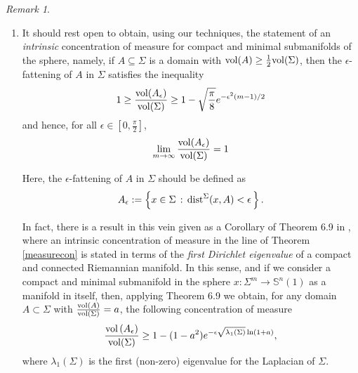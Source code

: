 \documentclass{amsart}
\theoremstyle{definition}
\theoremstyle{remark}
\newtheorem{remark}[theorem]{Remark}
\newcommand{\ese}{\mathbb{S}}
\begin{document}
\begin{remark}
\begin{enumerate}
\item  It should rest open to obtain, using our techniques, the statement of an {\em intrinsic} concentration of measure for compact and minimal submanifolds of the sphere, namely, if $A \subseteq \Sigma$ is a domain with ${\rm vol}(A) \geq \frac{1}{2} {\rm vol}(\Sigma)$, then the $\epsilon$-fattening of $A$ in $\Sigma$ satisfies the inequality
\begin{equation*}
1 \geq \frac{{\rm vol}(A_\epsilon)}{{\rm vol}(\Sigma)}\geq 1-\sqrt{\frac{\pi}{8}}e^{-\epsilon^2(m-1)/2}
\end{equation*}
\noindent and hence, for all $\epsilon \in [0,\frac{\pi}{2}]$, 
\begin{equation*}
\lim_{m\to \infty} \frac{{\rm vol}(A_\epsilon)}{{\rm vol}(\Sigma)}= 1
\end{equation*}
 

Here, the $\epsilon$-fattening of $A$ in $\Sigma$ should be defined as
$$A_\epsilon:=\left\{x\in \Sigma\, :\, {\rm dist}^{\Sigma}(x,A)<\epsilon\, \right\}.
$$

In fact, there is a result in this vein given as a Corollary of Theorem 6.9 in \cite{MS}, where an intrinsic concentration of measure in the line of Theorem \ref{measurecon} is stated in terms of the {\em first Dirichlet eigenvalue} of a compact and connected Riemannian manifold. In this sense, and if we consider a compact and minimal submanifold in the sphere $x:\Sigma^m \rightarrow \ese^n(1)$ as a manifold in itself, then, applying Theorem 6.9 we obtain, for any domain $A\subset \Sigma$ with $\frac{{\rm vol}(A)}{{\rm vol}( \Sigma)}=a$, the following concentration of measure
\begin{equation}\label{eq:Lambda}
   \frac{{\rm vol}\left(A_\epsilon\right)}{{\rm vol}( \Sigma)}\geq 1-(1-a^2)e^{-\epsilon\sqrt{\lambda_1(\Sigma)}\ln(1+a)}, 
\end{equation}
\noindent where $\lambda_1(\Sigma)$ is the first (non-zero) eigenvalue for the Laplacian of $\Sigma$.  
\medskip


\end{enumerate}
\end{remark}
\end{document}
